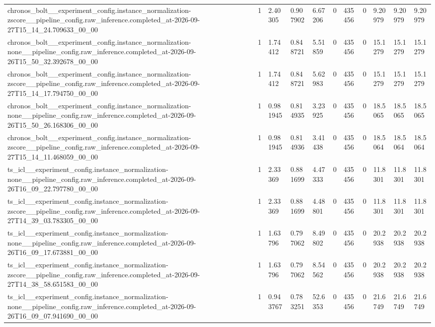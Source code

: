 \begin{tabular}{lllllllllll}
chronos\_bolt\_\_experiment\_config.instance\_normalization-zscore\_\_pipeline\_config.raw\_inference.completed\_at-2026-09-27T15\_14\_24.709633\_00\_00 & 1 & 2.40305 & 0.907902 & 6.67206 & 0 & 435456 & 0 & 9.20979 & 9.20979 & 9.20979 \\
chronos\_bolt\_\_experiment\_config.instance\_normalization-none\_\_pipeline\_config.raw\_inference.completed\_at-2026-09-26T15\_50\_32.392678\_00\_00 & 1 & 1.74412 & 0.848721 & 5.51859 & 0 & 435456 & 0 & 15.1279 & 15.1279 & 15.1279 \\
chronos\_bolt\_\_experiment\_config.instance\_normalization-zscore\_\_pipeline\_config.raw\_inference.completed\_at-2026-09-27T15\_14\_17.794750\_00\_00 & 1 & 1.74412 & 0.848721 & 5.62983 & 0 & 435456 & 0 & 15.1279 & 15.1279 & 15.1279 \\
chronos\_bolt\_\_experiment\_config.instance\_normalization-none\_\_pipeline\_config.raw\_inference.completed\_at-2026-09-26T15\_50\_26.168306\_00\_00 & 1 & 0.981945 & 0.814935 & 3.23925 & 0 & 435456 & 0 & 18.5065 & 18.5065 & 18.5065 \\
chronos\_bolt\_\_experiment\_config.instance\_normalization-zscore\_\_pipeline\_config.raw\_inference.completed\_at-2026-09-27T15\_14\_11.468059\_00\_00 & 1 & 0.981945 & 0.814936 & 3.41438 & 0 & 435456 & 0 & 18.5064 & 18.5064 & 18.5064 \\
ts\_icl\_\_experiment\_config.instance\_normalization-none\_\_pipeline\_config.raw\_inference.completed\_at-2026-09-26T16\_09\_22.797780\_00\_00 & 1 & 2.33369 & 0.881699 & 4.47333 & 0 & 435456 & 0 & 11.8301 & 11.8301 & 11.8301 \\
ts\_icl\_\_experiment\_config.instance\_normalization-zscore\_\_pipeline\_config.raw\_inference.completed\_at-2026-09-27T14\_39\_03.783305\_00\_00 & 1 & 2.33369 & 0.881699 & 4.48801 & 0 & 435456 & 0 & 11.8301 & 11.8301 & 11.8301 \\
ts\_icl\_\_experiment\_config.instance\_normalization-none\_\_pipeline\_config.raw\_inference.completed\_at-2026-09-26T16\_09\_17.673881\_00\_00 & 1 & 1.63796 & 0.797062 & 8.49802 & 0 & 435456 & 0 & 20.2938 & 20.2938 & 20.2938 \\
ts\_icl\_\_experiment\_config.instance\_normalization-zscore\_\_pipeline\_config.raw\_inference.completed\_at-2026-09-27T14\_38\_58.651583\_00\_00 & 1 & 1.63796 & 0.797062 & 8.54562 & 0 & 435456 & 0 & 20.2938 & 20.2938 & 20.2938 \\
ts\_icl\_\_experiment\_config.instance\_normalization-none\_\_pipeline\_config.raw\_inference.completed\_at-2026-09-26T16\_09\_07.941690\_00\_00 & 1 & 0.943767 & 0.783251 & 52.6353 & 0 & 435456 & 0 & 21.6749 & 21.6749 & 21.6749 \\

\end{tabular}
